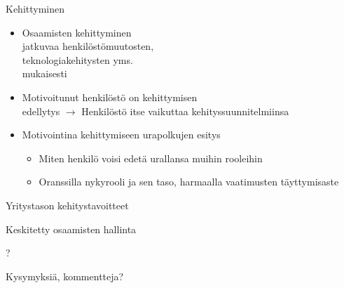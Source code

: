 \documentclass[first=purple,second=dblue,logo=redquo]{aaltoslides}
\begin{document}
\begin{frame}{Kehittyminen}
\begin{itemize}
\item Osaamisten kehittyminen \\ jatkuvaa henkilöstömuutosten, \\ teknologiakehitysten yms. \\ mukaisesti
\item Motivoitunut henkilöstö on kehittymisen \\ edellytys $\rightarrow$ Henkilöstö itse vaikuttaa kehityssuunnitelmiinsa
\item Motivointina kehittymiseen urapolkujen esitys
\begin{itemize}
\item Miten henkilö voisi edetä urallansa muihin rooleihin
\item Oranssilla nykyrooli ja sen taso, harmaalla vaatimusten täyttymisaste
\end{itemize}
\end{itemize}
\end{frame}
\begin{frame}{Yritystason kehitystavoitteet}

\end{frame}
\begin{frame}{Keskitetty osaamisten hallinta}

\end{frame}
{
\begin{frame}{?}
\begin{center}
Kysymyksiä, kommentteja?
\end{center}
\end{frame}
}
\end{document}
